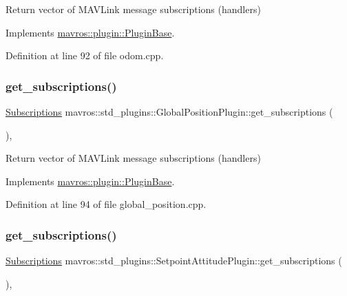 Return vector of M\+A\+V\+Link message subscriptions (handlers) 



Implements \mbox{\hyperlink{group__plugin_gaf4e23fec6d7436a62cbf0942a2e5791c}{mavros\+::plugin\+::\+Plugin\+Base}}.



Definition at line 92 of file odom.\+cpp.

\mbox{\label{group__plugin_ga0dfa5c046201515b43ef6e843b74c89a}} 
\subsubsection{\texorpdfstring{get\_subscriptions()}{get\_subscriptions()}\hspace{0.1cm}{\footnotesize\ttfamily [33/41]}}
{\footnotesize\ttfamily \mbox{\hyperlink{group__plugin_ga8967d61fc77040e0c3ea5a4585d62a09}{Subscriptions}} mavros\+::std\+\_\+plugins\+::\+Global\+Position\+Plugin\+::get\+\_\+subscriptions (\begin{DoxyParamCaption}{ }\end{DoxyParamCaption})\hspace{0.3cm}{\ttfamily [inline]}, {\ttfamily [virtual]}}



Return vector of M\+A\+V\+Link message subscriptions (handlers) 



Implements \mbox{\hyperlink{group__plugin_gaf4e23fec6d7436a62cbf0942a2e5791c}{mavros\+::plugin\+::\+Plugin\+Base}}.



Definition at line 94 of file global\+\_\+position.\+cpp.

\mbox{\label{group__plugin_ga41b8d12774fb380cb28817f5adec25e5}} 
\subsubsection{\texorpdfstring{get\_subscriptions()}{get\_subscriptions()}\hspace{0.1cm}{\footnotesize\ttfamily [34/41]}}
{\footnotesize\ttfamily \mbox{\hyperlink{group__plugin_ga8967d61fc77040e0c3ea5a4585d62a09}{Subscriptions}} mavros\+::std\+\_\+plugins\+::\+Setpoint\+Attitude\+Plugin\+::get\+\_\+subscriptions (\begin{DoxyParamCaption}{ }\end{DoxyParamCaption})\hspace{0.3cm}{\ttfamily [inline]}, {\ttfamily [virtual]}}



